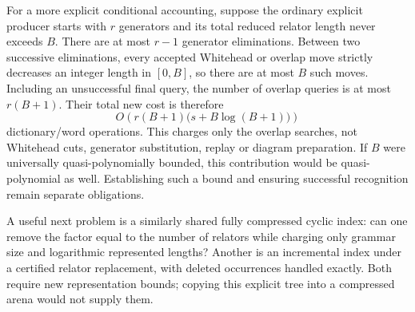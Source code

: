 For a more explicit conditional accounting, suppose the ordinary explicit
producer starts with $r$ generators and its total reduced relator length
never exceeds $B$.  There are at most $r-1$ generator eliminations.  Between
two successive eliminations, every accepted Whitehead or overlap move
strictly decreases an integer length in $[0,B]$, so there are at most $B$
such moves.  Including an unsuccessful final query, the number of overlap
queries is at most $r(B+1)$.  Their total new cost is therefore
\[
 O\!\left(r(B+1)\bigl(s+B\log(B+1)\bigr)\right)
\]
dictionary/word operations.  This charges only the overlap searches, not
Whitehead cuts, generator substitution, replay or diagram preparation.
If $B$ were universally quasi-polynomially bounded, this contribution
would be quasi-polynomial as well.  Establishing such a bound and ensuring
successful recognition remain separate obligations.

A useful next problem is a similarly shared fully compressed cyclic index:
can one remove the factor equal to the number of relators while charging
only grammar size and logarithmic represented lengths?  Another is an
incremental index under a certified relator replacement, with deleted
occurrences handled exactly.  Both require new representation bounds;
copying this explicit tree into a compressed arena would not supply them.
